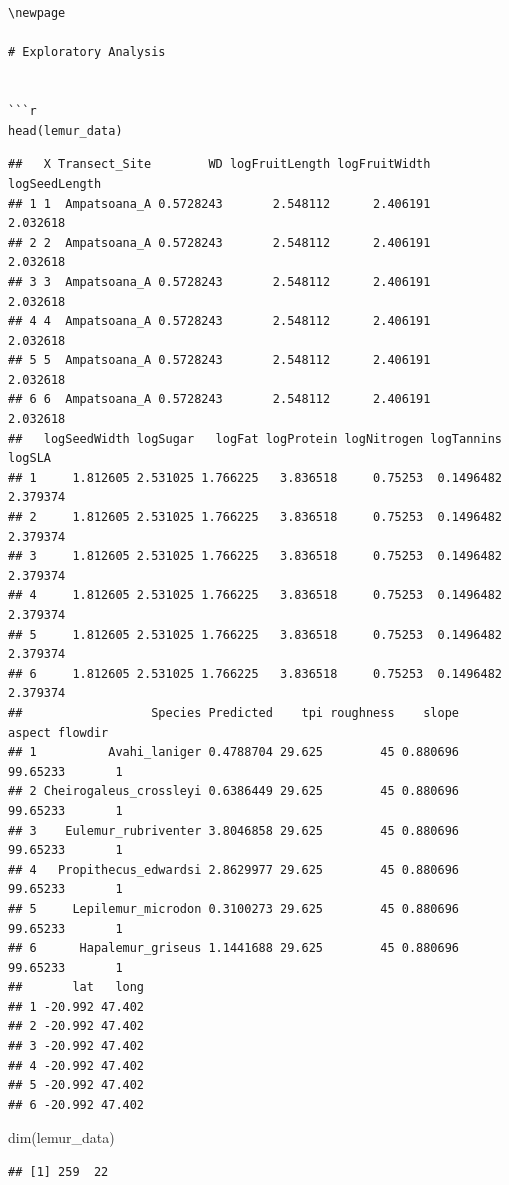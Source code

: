 \documentclass[
  12pt,
]{article}
\newenvironment{Shaded}{\begin{snugshade}}{\end{snugshade}}
\newcommand{\FunctionTok}[1]{\textcolor[rgb]{0.00,0.00,0.00}{#1}}
\newcommand{\NormalTok}[1]{#1}
\begin{document}
\begin{verbatim}


\newpage

# Exploratory Analysis 


```r
head(lemur_data)
\end{verbatim}

\begin{verbatim}
##   X Transect_Site        WD logFruitLength logFruitWidth logSeedLength
## 1 1  Ampatsoana_A 0.5728243       2.548112      2.406191      2.032618
## 2 2  Ampatsoana_A 0.5728243       2.548112      2.406191      2.032618
## 3 3  Ampatsoana_A 0.5728243       2.548112      2.406191      2.032618
## 4 4  Ampatsoana_A 0.5728243       2.548112      2.406191      2.032618
## 5 5  Ampatsoana_A 0.5728243       2.548112      2.406191      2.032618
## 6 6  Ampatsoana_A 0.5728243       2.548112      2.406191      2.032618
##   logSeedWidth logSugar   logFat logProtein logNitrogen logTannins   logSLA
## 1     1.812605 2.531025 1.766225   3.836518     0.75253  0.1496482 2.379374
## 2     1.812605 2.531025 1.766225   3.836518     0.75253  0.1496482 2.379374
## 3     1.812605 2.531025 1.766225   3.836518     0.75253  0.1496482 2.379374
## 4     1.812605 2.531025 1.766225   3.836518     0.75253  0.1496482 2.379374
## 5     1.812605 2.531025 1.766225   3.836518     0.75253  0.1496482 2.379374
## 6     1.812605 2.531025 1.766225   3.836518     0.75253  0.1496482 2.379374
##                  Species Predicted    tpi roughness    slope   aspect flowdir
## 1          Avahi_laniger 0.4788704 29.625        45 0.880696 99.65233       1
## 2 Cheirogaleus_crossleyi 0.6386449 29.625        45 0.880696 99.65233       1
## 3    Eulemur_rubriventer 3.8046858 29.625        45 0.880696 99.65233       1
## 4   Propithecus_edwardsi 2.8629977 29.625        45 0.880696 99.65233       1
## 5     Lepilemur_microdon 0.3100273 29.625        45 0.880696 99.65233       1
## 6      Hapalemur_griseus 1.1441688 29.625        45 0.880696 99.65233       1
##       lat   long
## 1 -20.992 47.402
## 2 -20.992 47.402
## 3 -20.992 47.402
## 4 -20.992 47.402
## 5 -20.992 47.402
## 6 -20.992 47.402
\end{verbatim}

\begin{Shaded}
\begin{Highlighting}[]
\FunctionTok{dim}\NormalTok{(lemur\_data)}
\end{Highlighting}
\end{Shaded}

\begin{verbatim}
## [1] 259  22
\end{verbatim}
\end{document}
